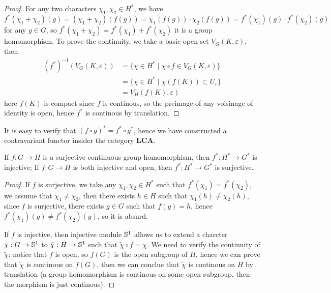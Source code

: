 \begin{proof}
    For any two characters \(\chi_1, \chi_2 \in H^*\), we have
    \[f^*(\chi_1 + \chi_2)(g) = (\chi_1 + \chi_2)(f(g)) = \chi_1(f(g)) \cdot \chi_2(f(g)) = f^*(\chi_1)(g) \cdot f^*(\chi_2)(g)\]
    for any \(g \in G\), so \(f^*(\chi_1 + \chi_2) = f^*(\chi_1) + f^*(\chi_2)\) it is a group homomorphism. To prove the continuity, we take a basic open set \(V_G(K,\varepsilon)\), then
    \begin{align*}
    (f^*)^{-1}(V_G(K,\varepsilon)) &= \{\chi \in H^* \mid \chi \circ f \in V_G(K,\varepsilon)\} \\
    &= \{\chi \in H^* \mid \chi (f(K)) \subset U_{\varepsilon}\}\\
    &= V_H(f(K),\varepsilon)
    \end{align*}
    here \(f(K)\) is compact since \(f\) is continous, so the preimage of any voisinage of identity is open, hence \(f^*\) is continous by translation.
\end{proof}

It is easy to verify that \((f\circ g )^* = f^* \circ g^*\),  hence we have constructed a contravariant functor insider the category \(\mathbf{LCA}\). 

\begin{lemma}
    If \(f:G \to H\) is a surjective continuous group homomorphism, then \(f^*: H^* \to G^*\) is injective; If \(f:G \to H\) is both injective and open, then \(f^*: H^* \to G^*\) is surjective.
\end{lemma}
\begin{proof}
    If \(f\) is surjective, we take any \(\chi_1, \chi_2 \in H^*\) such that \(f^*(\chi_1) = f^*(\chi_2)\), we assume that \(\chi_1 \neq \chi_2\), then there exists \(h \in H\) such that \(\chi_1(h) \neq \chi_2(h)\), since \(f\) is surjective, there exists \(g \in G\) such that \(f(g) = h\), hence
    \(f^*(\chi_1)(g) \neq f^*(\chi_2)(g)\), so it is absurd.

    If \(f\) is injective, then injective module \(\mathbb{S}^1\) allows us to extend a charcter \(\chi:G \to \mathbb{S}^1\) to \(\tilde{\chi}: H \to \mathbb{S}^1\) such that \(\tilde{\chi} \circ f = \chi\). We need to verify the continuity of \(\tilde{\chi}\): notice that \(f\) is open, so \(f(G)\) is the open subgroup of \(H\), hence we can prove that \(\tilde{\chi}\) is continous on \(f(G)\), then we can conclue that \(\tilde{\chi}\) is continous on \(H\) by translation (a group homomorphism is continous on some open subgroup, then the morphism is just continous).
\end{proof}

